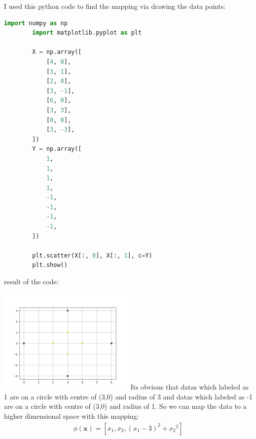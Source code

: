 \documentclass[12pt]{article}
\begin{document}
\begin{qsolve}
    I used this python code to find the mapping via drawing the data points:
    \begin{lstlisting}[language=Python]
        import numpy as np
        import matplotlib.pyplot as plt

        X = np.array([
            [4, 0],
            [3, 1],
            [2, 0],
            [3, -1],
            [6, 0],
            [3, 3],
            [0, 0],
            [3, -3],
        ])
        Y = np.array([
            1,
            1,
            1,
            1,
            -1,
            -1,
            -1,
            -1,
        ])

        plt.scatter(X[:, 0], X[:, 1], c=Y)
        plt.show()
    \end{lstlisting}
    result of the code:\\
    \\
    \includegraphics[width=0.5\textwidth]{plot3.png}
    Its obvious that datas which labeled as 1 are on a circle with centre of (3,0) and radius of 3 and datas which labeled as -1 are on a circle with centre of (3,0) and radius of 1.
    So we can map the data to a higher dimensional space with this mapping:
    \begin{gather*}
        \phi(\mathbf{x}) = [x_1,x_2,(x_1-3)^2+{x_2}^2]
    \end{gather*}
\end{qsolve}




















\makeendpage
\end{document}

